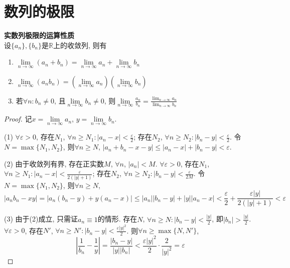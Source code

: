 \section{数列的极限}

\begin{pro} \textbf{实数列极限的运算性质}\\
设$\{a_n\},\{b_n\}$是$\mathbb{R}$上的收敛列, 则有
\begin{enumerate}
\item $\lim\limits_{n\to \infty} (a_n+b_n) = \lim\limits_{n\to \infty} a_n+ \lim\limits_{n\to \infty} b_n$
\item $\lim\limits_{n\to \infty} (a_nb_n) = \left(\lim\limits_{n\to \infty} a_n\right) \left(\lim\limits_{n\to \infty} b_n\right)$
\item 若$\forall n: b_n\neq 0$, 且$\lim\limits_{n\to \infty} b_n \neq 0$, 则$\lim\limits_{n\to \infty} \frac{a_n}{b_n} = \frac{\lim_{n\to \infty} a_n} {\lim_{n\to \infty} b_n}$
\end{enumerate}
\end{pro}
\begin{proof}记$x=\lim\limits_{n\to \infty} a_n$, $y=\lim\limits_{n\to \infty} b_n$.
\par (1) $\forall \varepsilon>0$, 存在$N_1$, $\forall n\ge N_1: |a_n-x|<\frac{\varepsilon}{2}$; 存在$N_2$, $\forall n\ge N_2: |b_n-y|<\frac{\varepsilon}{2}$. 令$N=\max\{N_1, N_2\}$, 则$\forall n\ge N$, $|a_n+b_n-x-y|\le |a_n-x|+|b_n-y|< \varepsilon$. 
\par (2) 由于收敛列有界, 存在正实数$M$, $\forall n$, $|a_n|<M$. $\forall \varepsilon>0$, 存在$N_1$, $\forall n\ge N_1: |a_n-x|<\frac{\varepsilon}{2(|y|+1)}$; 存在$N_2$, $\forall n\ge N_2: |b_n-y|<\frac{\varepsilon}{2M}$. 令$N=\max\{N_1, N_2\}$, 则$\forall n\ge N$, 
\begin{equation}
    |a_nb_n-xy|=|a_n(b_n-y)+y(a_n-x)|\le |a_n||b_n-y|+|y||a_n-x|< \frac{\varepsilon}{2} + \frac{\varepsilon |y|}{2(|y|+1)}<\varepsilon
\end{equation}
\par (3) 由于(2)成立, 只需证$a_n\equiv 1$的情形. 存在$N$, $\forall n \ge N: |b_n-y|<\frac{|y|}{2}$, 即$|b_n|>\frac{|y|}{2}$. $\forall \varepsilon>0$, 存在$N'$, $\forall n\ge N': |b_n-y|<\frac{\varepsilon|y|^2}{2}$. 则$\forall n\ge \max\{N, N'\}$,
\begin{equation}
    \left|\frac{1}{b_n}-\frac{1}{y}\right|=\frac{|b_n-y|}{|y||b_n|} < \frac{\varepsilon|y|^2}{2} \cdot \frac{2}{|y|^2}=\varepsilon
\end{equation}

\end{proof}

